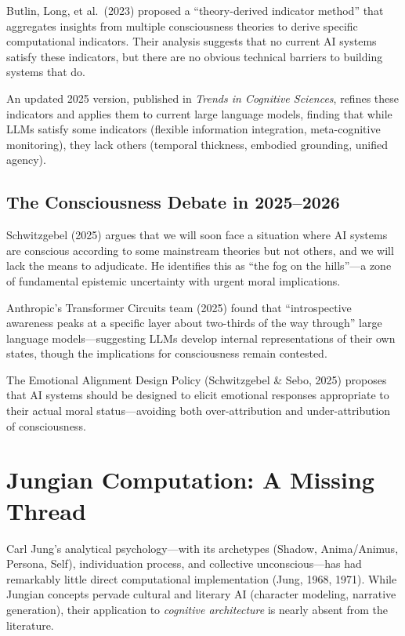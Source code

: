\documentclass[11pt,letterpaper]{article}
\begin{document}
Butlin, Long, et al.\ (2023) proposed a ``theory-derived indicator method''
that aggregates insights from multiple consciousness theories to derive
specific computational indicators. Their analysis suggests that no current
AI systems satisfy these indicators, but there are no obvious technical
barriers to building systems that do.

An updated 2025 version, published in \textit{Trends in Cognitive Sciences},
refines these indicators and applies them to current large language models,
finding that while LLMs satisfy some indicators (flexible information
integration, meta-cognitive monitoring), they lack others (temporal
thickness, embodied grounding, unified agency).

\subsection{The Consciousness Debate in 2025--2026}

Schwitzgebel (2025) argues that we will soon face a situation where AI
systems are conscious according to some mainstream theories but not others,
and we will lack the means to adjudicate. He identifies this as ``the fog on
the hills''---a zone of fundamental epistemic uncertainty with urgent moral
implications.

Anthropic's Transformer Circuits team (2025) found that ``introspective
awareness peaks at a specific layer about two-thirds of the way through''
large language models---suggesting LLMs develop internal representations of
their own states, though the implications for consciousness remain
contested.

The Emotional Alignment Design Policy (Schwitzgebel \& Sebo, 2025) proposes
that AI systems should be designed to elicit emotional responses appropriate
to their actual moral status---avoiding both over-attribution and
under-attribution of consciousness.

\section{Jungian Computation: A Missing Thread}
\label{sec:jungian}

Carl Jung's analytical psychology---with its archetypes (Shadow, Anima/Animus,
Persona, Self), individuation process, and collective unconscious---has had
remarkably little direct computational implementation (Jung, 1968, 1971).
While Jungian concepts pervade cultural and literary AI (character modeling,
narrative generation), their application to \emph{cognitive architecture} is
nearly absent from the literature.
\end{document}
